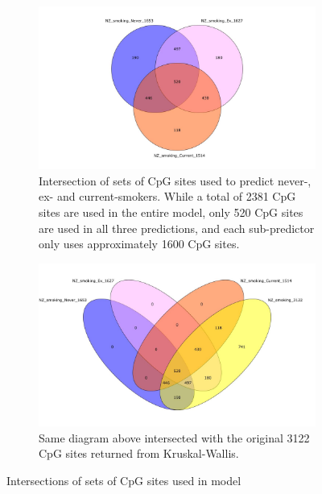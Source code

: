 \documentclass{article}
\begin{document}
\begin{figure}
    \centering
    \begin{subfigure}{\textwidth}
        \centering
        \includegraphics[width=\linewidth]{Venn_NZ_3gps.jpg}
        \caption{Intersection of sets of CpG sites used to predict never-, ex- and current-smokers. While a total of 2381 CpG sites are used in the entire model, only 520 CpG sites are used in all three predictions, and each sub-predictor only uses approximately 1600 CpG sites.}
    \end{subfigure}
    \begin{subfigure}{\textwidth}
        \centering
        \includegraphics[width=\linewidth]{Venn_NZ_3gps_KWlist.jpg}
        \caption{Same diagram above intersected with the original 3122 CpG sites returned from Kruskal-Wallis.}
    \end{subfigure}
    \caption{Intersections of sets of CpG sites used in model}
    \label{fig:model-intersect}
\end{figure}
\end{document}

